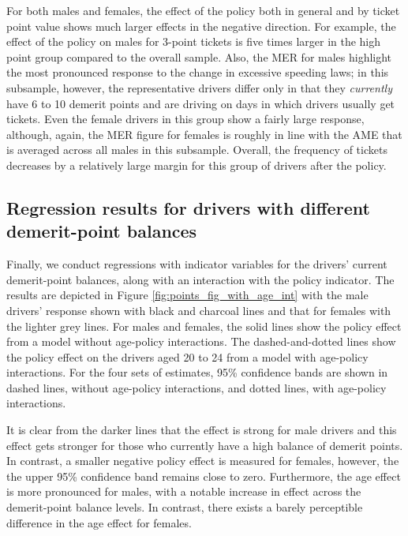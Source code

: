 For both males and females, 
the effect of the policy both in general and by ticket point value 
shows much larger effects in the negative direction. 
For example, the effect of the policy on males for 3-point tickets is five times larger 
in the high point group compared to the overall sample. 
% 
Also, the MER for males highlight the most pronounced response to the
change in excessive speeding laws; 
in this subsample, however, the representative drivers differ only 
in that they \emph{currently} have 6 to 10 demerit points 
and are driving on days in which drivers usually get tickets.  
% 
Even the female drivers in this group show a fairly large response, 
although, again, the MER figure for females is roughly in line with 
the AME that is averaged across all males in this subsample. 
% 
Overall, the frequency of tickets decreases by a relatively large margin 
for this group of drivers after the policy.



\subsection{Regression results for drivers with different demerit-point balances}
\label{sec:Empirical_w_pts_grp}

Finally, we conduct regressions with indicator variables 
for the drivers' current demerit-point balances, 
along with an interaction with the policy indicator. 
% 
The results are depicted in Figure \ref{fig:points_fig_with_age_int}
with the male drivers' response shown with black and charcoal lines
and that for females with the lighter grey lines. 
For males and females, the solid lines show the policy effect 
from a model without age-policy interactions. 
The dashed-and-dotted lines show the policy effect 
on the drivers aged 20 to 24 from a model with age-policy interactions. 
For the four sets of estimates, 95\% confidence bands are shown in 
dashed lines, without age-policy interactions,
and dotted lines, with age-policy interactions.

It is clear from the darker lines 
that the effect is strong for male drivers and this effect gets stronger for 
those who currently have a high balance of demerit points. 
In contrast, a smaller negative policy effect is measured for females, 
however, the the upper 95\% confidence band 
remains close to zero. 
Furthermore, the age effect is more pronounced for males, 
with a notable increase in effect across the demerit-point balance levels. 
In contrast, there exists a barely perceptible difference in the age effect for females. 




